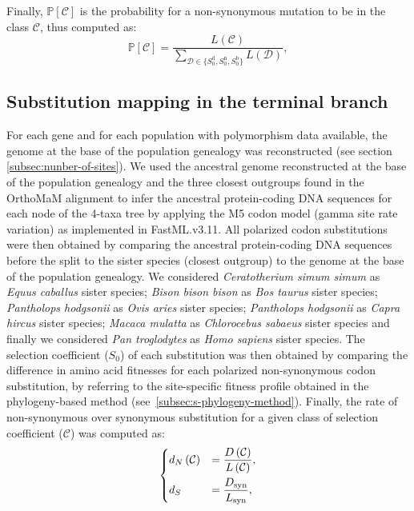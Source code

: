 \documentclass{article}
\newcommand{\proba}{\mathbb{P}}
\newcommand{\dn}{d_N}
\newcommand{\ds}{d_S}
\newcommand{\Sphy}{S_{0}}
\newcommand{\Sphyclass}{\mathcal{C}}
\begin{document}
    Finally, $\proba [ \Sphyclass ]$ is the probability for a non-synonymous mutation to be in the class $\Sphyclass$, thus computed as:
    \begin{equation}
        \proba[\Sphyclass] = \frac{L\left( \Sphyclass \right)}{\sum_{\mathcal{D}\in \{\Sphy^{\text{d}}, \Sphy^{\text{n}}, \Sphy^{\text{b}} \} } L\left(\mathcal{D} \right)},
        \label{eq:proba-dfe-mutsel}
    \end{equation}

    \subsection{Substitution mapping in the terminal branch}
    \label{subsec:substitution-mapping-in-the-terminal-branch}
    For each gene and for each population with polymorphism data available, the genome at the base of the population genealogy was reconstructed (see section \ref{subsec:nunber-of-sites}).
    We used the ancestral genome reconstructed at the base of the population genealogy and the three closest outgroups found in the OrthoMaM alignment to infer the ancestral protein-coding DNA sequences for each node of the 4-taxa tree by applying the M5 codon model (gamma site rate variation) as implemented in FastML.v3.11\cite{ashkenazy_fastml_2012}.
    All polarized codon substitutions were then obtained by comparing the ancestral protein-coding DNA sequences before the split to the sister species (closest outgroup) to the genome at the base of the population genealogy.
    We considered \textit{Ceratotherium simum simum} as \textit{Equus caballus} sister species; \textit{Bison bison bison} as \textit{Bos taurus} sister species; \textit{Pantholops hodgsonii} as \textit{Ovis aries} sister species; \textit{Pantholops hodgsonii} as \textit{Capra hircus} sister species; \textit{Macaca mulatta} as \textit{Chlorocebus sabaeus} sister species and finally we considered \textit{Pan troglodytes} as \textit{Homo sapiens} sister species.
    The selection coefficient ($\Sphy$) of each substitution was then obtained by comparing the difference in amino acid fitnesses for each polarized non-synonymous codon substitution, by referring to the site-specific fitness profile obtained in the phylogeny-based method (see~\ref{subsec:s-phylogeny-method}).
    Finally, the rate of non-synonymous over synonymous substitution for a given class of selection coefficient ($\Sphyclass$) was computed as:
    \begin{align}
        \begin{dcases}
            \dn \left( \Sphyclass \right) &= \dfrac{D\left( \Sphyclass \right)}{L \left( \Sphyclass \right)}, \\
            \ds &= \dfrac{D_{\text{syn}}}{L_{\text{syn}}},
        \end{dcases}
    \end{align}
\end{document}
